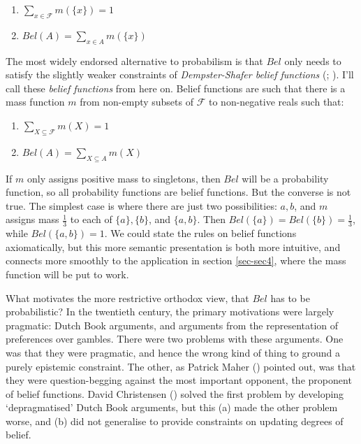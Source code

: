 \documentclass[
  11pt,
  letterpaper,
  DIV=11,
  numbers=noendperiod,
  twoside]{scrartcl}
\providecommand{\tightlist}{%
  \setlength{\itemsep}{0pt}\setlength{\parskip}{0pt}}
\begin{document}
\begin{enumerate}
\def\labelenumi{\arabic{enumi}.}
\tightlist
\item
  \(\sum_{x \in \mathcal{F}} m(\{x\}) = 1\)
\item
  \(Bel(A) = \sum_{x \in A} m(\{x\})\)
\end{enumerate}

The most widely endorsed alternative to probabilism is that \(Bel\) only
needs to satisfy the slightly weaker constraints of
\emph{Dempster-Shafer belief functions}
(;
). I'll call these \emph{belief
functions} from here on. Belief functions are such that there is a mass
function \(m\) from non-empty subsets of \(\mathcal{F}\) to non-negative
reals such that:

\begin{enumerate}
\def\labelenumi{\arabic{enumi}.}
\tightlist
\item
  \(\sum_{X \subseteq \mathcal{F}} m(X) = 1\)
\item
  \(Bel(A) = \sum_{X \subseteq A} m(X)\)
\end{enumerate}

If \(m\) only assigns positive mass to singletons, then \(Bel\) will be
a probability function, so all probability functions are belief
functions. But the converse is not true. The simplest case is where
there are just two possibilities: \(a, b\), and \(m\) assigns mass
\(\frac{1}{3}\) to each of \(\{a\}, \{b\}\), and \(\{a, b\}\). Then
\(Bel(\{a\}) = Bel(\{b\}) = \frac{1}{3}\), while \(Bel(\{a, b\}) = 1\).
We could state the rules on belief functions axiomatically, but this
more semantic presentation is both more intuitive, and connects more
smoothly to the application in section \ref{sec-sec4}, where the mass
function will be put to work.

What motivates the more restrictive orthodox view, that \(Bel\) has to
be probabilistic? In the twentieth century, the primary motivations were
largely pragmatic: Dutch Book arguments, and arguments from the
representation of preferences over gambles. There were two problems with
these arguments. One was that they were pragmatic, and hence the wrong
kind of thing to ground a purely epistemic constraint. The other, as
Patrick Maher () pointed out, was that
they were question-begging against the most important opponent, the
proponent of belief functions. David Christensen
() solved the first problem by
developing `depragmatised' Dutch Book arguments, but this (a) made the
other problem worse, and (b) did not generalise to provide constraints
on updating degrees of belief.
\end{document}
